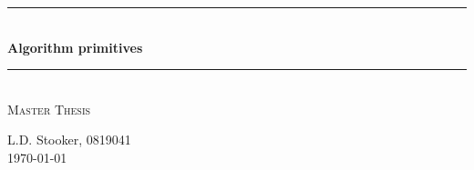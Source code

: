 \documentclass[a4paper,10pt]{article}
\begin{document}
\begin{titlepage}

\newcommand{\HRule}{\rule{\linewidth}{0.5mm}} %

\centering %

\HRule \\[0.4cm]
{ \Huge \bfseries Algorithm primitives}\\[0.4cm] %
\HRule \\[1.5cm]


\textsc{\large Master Thesis}\\[1.0cm] %


\vfill %

L.D. Stooker, 0819041 \\ [1cm]



{\large \today}\\[3cm] %






\end{titlepage}
\end{document}
